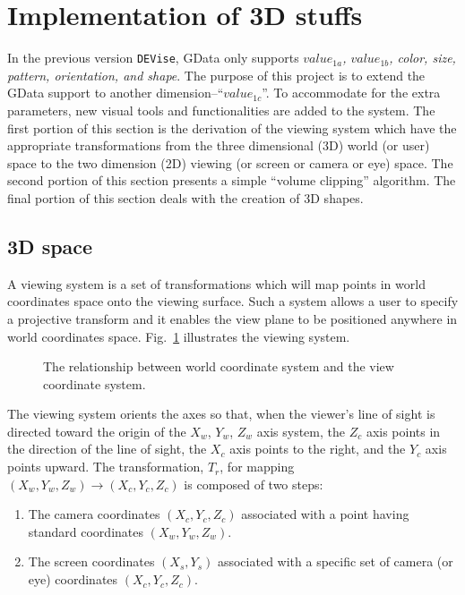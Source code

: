 \section{Implementation of 3D stuffs}

In the previous version {\tt DEVise}, GData only supports {\it 
$value_{1a}$, $value_{1b}$, color, size, pattern, orientation, and 
shape}.  The purpose of this project is to extend the GData 
support to another dimension--``$value_{1c}$''.  To accommodate for the
extra parameters, new visual tools and functionalities are added to
the system.  The first portion of this section
is the derivation of the viewing system which have the appropriate
transformations from the three dimensional
(3D) world (or user) space to the two dimension (2D) viewing (or 
screen or camera or eye) space.  The second portion of this 
section presents a simple 
``volume clipping'' algorithm.  The final portion of this section 
deals with the creation of 3D shapes.

\subsection{3D space}

A viewing system is a set of 
transformations which will map points in world coordinates space onto
the viewing surface.  Such a system allows a user to specify a
projective transform and it enables the view plane to be positioned
anywhere in world coordinates space.  Fig.~\ref{fig:view_sys}
illustrates the viewing system.

\begin {figure}[htbp]
 \centerline{
 }
 \caption{The relationship between world coordinate system and the
 	view coordinate system.}
 \label{fig:view_sys}
\end   {figure}

The viewing system orients the axes so that, when the viewer's line
of sight is directed toward the origin of the $X_w$, $Y_w$, $Z_w$
axis system, the $Z_c$ axis points in the direction of the line of
sight, the $X_c$ axis points to the right, and the $Y_c$ axis points
upward.  The transformation, $T_r$, for mapping $(X_w, Y_w, Z_w)
\rightarrow (X_c, Y_c, Z_c)$ is composed of two steps:

\begin{enumerate}
	\item The camera coordinates $(X_c, Y_c, Z_c)$ associated with 
		a point having standard coordinates $(X_w, Y_w, Z_w)$.
	\item The screen coordinates $(X_s, Y_s)$ associated with a 
		specific set of camera (or eye) coordinates $(X_c, Y_c,
		Z_c)$.
\end{enumerate}

